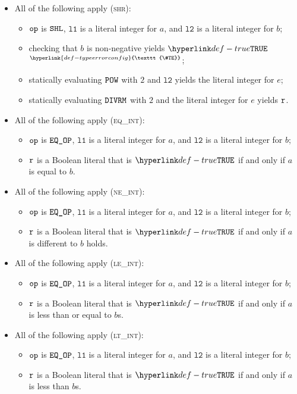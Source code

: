 \documentclass{book}
\newcommand\TypeErrorConfig[0]{\hyperlink{def-typeerrorconfig}{\texttt{\#TE}}}
\newcommand\ProseOrTypeError[0]{\hyperlink{def-proseortypeerror}{$^{\TypeErrorConfig}$}}
\newcommand\vlone[0]{\texttt{l1}}
\newcommand\vltwo[0]{\texttt{l2}}
\begin{document}
\begin{itemize}
  \item All of the following apply (\textsc{shr}):
  \begin{itemize}
    \item $\texttt{op}$ is $\texttt{SHL}$, $\vlone$ is a literal integer for $a$, and $\vltwo$ is a literal integer for $b$;
    \item checking that $b$ is non-negative yields $\True$ \ProseOrTypeError;
    \item statically evaluating $\texttt{POW}$ with $2$ and $\vltwo$ yields the literal integer for $e$;
    \item statically evaluating $\texttt{DIVRM}$ with $2$ and the literal integer for $e$ yields $\texttt{r}$.
  \end{itemize}

  \item All of the following apply (\textsc{eq\_int}):
  \begin{itemize}
    \item $\texttt{op}$ is $\texttt{EQ\_OP}$, $\vlone$ is a literal integer for $a$, and $\vltwo$ is a literal integer for $b$;
    \item $\texttt{r}$ is a Boolean literal that is $\True$ if and only if $a$ is equal to $b$.
  \end{itemize}

  \item All of the following apply (\textsc{ne\_int}):
  \begin{itemize}
    \item $\texttt{op}$ is $\texttt{EQ\_OP}$, $\vlone$ is a literal integer for $a$, and $\vltwo$ is a literal integer for $b$;
    \item $\texttt{r}$ is a Boolean literal that is $\True$ if and only if $a$ is different to $b$ holds.
  \end{itemize}

  \item All of the following apply (\textsc{le\_int}):
  \begin{itemize}
    \item $\texttt{op}$ is $\texttt{EQ\_OP}$, $\vlone$ is a literal integer for $a$, and $\vltwo$ is a literal integer for $b$;
    \item $\texttt{r}$ is a Boolean literal that is $\True$ if and only if $a$ is less than or equal to $b$s.
  \end{itemize}

  \item All of the following apply (\textsc{lt\_int}):
  \begin{itemize}
    \item $\texttt{op}$ is $\texttt{EQ\_OP}$, $\vlone$ is a literal integer for $a$, and $\vltwo$ is a literal integer for $b$;
    \item $\texttt{r}$ is a Boolean literal that is $\True$ if and only if $a$ is less than $b$s.
  \end{itemize}


\end{itemize}
\end{document}
